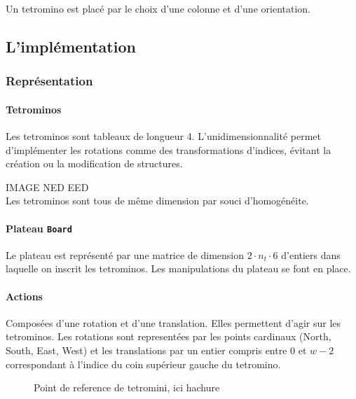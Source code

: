 \documentclass{article}
\begin{document}
Un tetromino est plac\'e par le choix d'une colonne et d'une orientation.

\subsection{L'impl\'ementation}

\subsubsection{Représentation}

\paragraph{Tetrominos}
Les tetrominos sont tableaux de longueur 4. L'unidimensionnalit\'e permet
d'impl\'ementer les rotations comme des transformations d'indices, \'evitant la
cr\'eation ou la modification de structures.

IMAGE NED EED\\
Les tetrominos sont tous de même dimension par souci d'homogénéite.

\paragraph{Plateau \texttt{Board}}
Le plateau est repr\'esent\'e par une matrice de dimension
\(2\cdot n_t\cdot 6\) d'entiers dans laquelle on inscrit les tetrominos. Les
manipulations du plateau se font en place.


\paragraph{Actions}
Composées d'une rotation et d'une translation. Elles permettent d'agir sur les
tetrominos. Les rotations sont representées par les points cardinaux
(North, South, East, West) et les translations par un entier compris entre 0 et
\(w - 2\) correspondant à l'indice du coin supérieur gauche du tetromino.
\begin{figure}
  \centering
  \qquad
  \caption{Point de reference de tetromini, ici hachure}\label{fig:tetref}
\end{figure}
\end{document}
